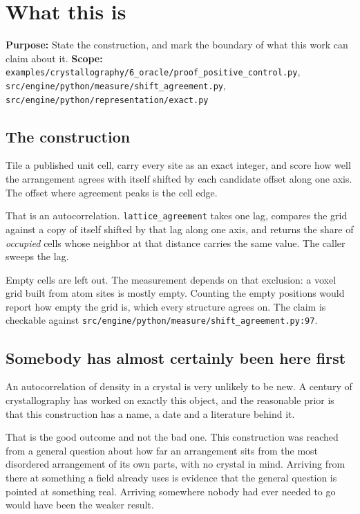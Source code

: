 \chapter{What this is}

\textbf{Purpose:} State the construction, and mark the boundary of what this work can claim about it.
\textbf{Scope:} \texttt{examples/\allowbreak{}crystallography/\allowbreak{}6\_\allowbreak{}oracle/\allowbreak{}proof\_\allowbreak{}positive\_\allowbreak{}control.\allowbreak{}py}, \texttt{src/\allowbreak{}engine/\allowbreak{}python/\allowbreak{}measure/\allowbreak{}shift\_\allowbreak{}agreement.\allowbreak{}py}, \texttt{src/\allowbreak{}engine/\allowbreak{}python/\allowbreak{}representation/\allowbreak{}exact.\allowbreak{}py}

\section{The construction}

Tile a published unit cell, carry every site as an exact integer, and score how well the arrangement agrees with itself shifted by each candidate offset along one axis. The offset where agreement peaks is the cell edge.

That is an autocorrelation. \texttt{lattice\_\allowbreak{}agreement} takes one lag, compares the grid against a copy of itself shifted by that lag along one axis, and returns the share of \emph{occupied} cells whose neighbor at that distance carries the same value. The caller sweeps the lag.

Empty cells are left out. The measurement depends on that exclusion: a voxel grid built from atom sites is mostly empty. Counting the empty positions would report how empty the grid is, which every structure agrees on. The claim is checkable against \texttt{src/\allowbreak{}engine/\allowbreak{}python/\allowbreak{}measure/\allowbreak{}shift\_\allowbreak{}agreement.\allowbreak{}py:97}.

\section{Somebody has almost certainly been here first}

An autocorrelation of density in a crystal is very unlikely to be new. A century of crystallography has worked on exactly this object, and the reasonable prior is that this construction has a name, a date and a literature behind it.

That is the good outcome and not the bad one. This construction was reached from a general question about how far an arrangement sits from the most disordered arrangement of its own parts, with no crystal in mind. Arriving from there at something a field already uses is evidence that the general question is pointed at something real. Arriving somewhere nobody had ever needed to go would have been the weaker result.

